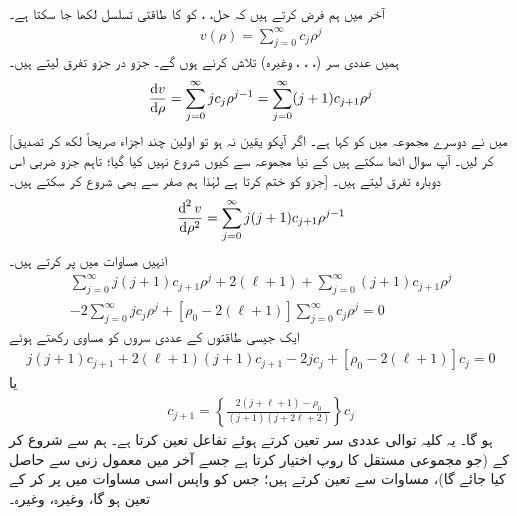  آخر میں ہم فرض کرتے ہیں کہ حل، ، کو  کا طاقتی تسلسل لکھا جا سکتا ہے۔
 \begin{align}
v(\rho)=\sum_{j=0}^{\infty}c_{j}\rho^{j} 
\end{align}
ہمیں عددی سر (، ، ، وغیرہ) تلاش کرنے ہوں گے۔ جزو در جزو تفرق لیتے ہیں۔
\begin{align*}
\frac{\dif{v}}{\dif{\rho}}=\sum_{j=0}^{\infty}jc_{j}\rho^{j-1}=\sum_{j=0}^{\infty}(j+1)c_{j+1}\rho^{j} 
\end{align*}
[میں نے دوسرے مجموعہ میں   کو  کہا ہے۔ اگر آپکو یقین نہ ہو تو اولین چند اجزاء صریحاً لکھ کر تصدیق کر لیں۔ آپ سوال اٹھا سکتے ہیں کے نیا مجموعہ  سے کیوں شروع نہیں کیا گیا؛ تاہم جزو ضربی  اس جزو کو ختم کرتا ہے لہٰذا ہم صفر سے بھی شروع کر سکتے ہیں۔] دوبارہ تفرق لیتے ہیں۔
\begin{align*}
\frac{\dif^{\,2}{v}}{\dif{\rho^{2}}}=\sum_{j=0}^{\infty}j(j+1)c_{j+1}\rho^{j-1} 
\end{align*}
انہیں مساوات  میں پر کرتے ہیں۔
\begin{multline*}
\sum_{j=0}^{\infty}j(j+1)c_{j+1}\rho^{j}+2(\ell+1)+\sum_{j=0}^{\infty}(j+1)c_{j+1}\rho^{j} \\
-2\sum_{j=0}^{\infty}jc_{j}\rho^{j}+[\rho_{0}-2(\ell+1)]\sum_{j=0}^{\infty}c_{j}\rho^{j}=0 
\end{multline*}
ایک جیسی طاقتوں کے عددی سروں کو مساوی رکھتے ہوئے
\begin{align*}
j(j+1)c_{j+1}+2(\ell+1)(j+1)c_{j+1}-2jc_{j}+[\rho_{0}-2(\ell+1)]c_{j}=0 
\end{align*}
یا
\begin{align}\label{مساوات_ابعادی_کولمب_کلیہ_توالی}
c_{j+1}=\left\{\frac{2(j+\ell+1)-\rho_{0}}{(j+1)(j+2\ell+2)}\right\}c_{j} 
\end{align}
ہو گا۔ یہ کلیہ توالی عددی سر تعین کرتے ہوئے تفاعل  تعین کرتا ہے۔ ہم  سے شروع کر کے (جو مجموعی مستقل کا روپ اختیار کرتا ہے جسے آخر میں معمول زنی سے حاصل کیا جائے گا)، مساوات  سے  تعین کرتے ہیں؛ جس کو واپس اسی مساوات میں پر کر کے  تعین ہو گا، وغیرہ، وغیرہ۔

